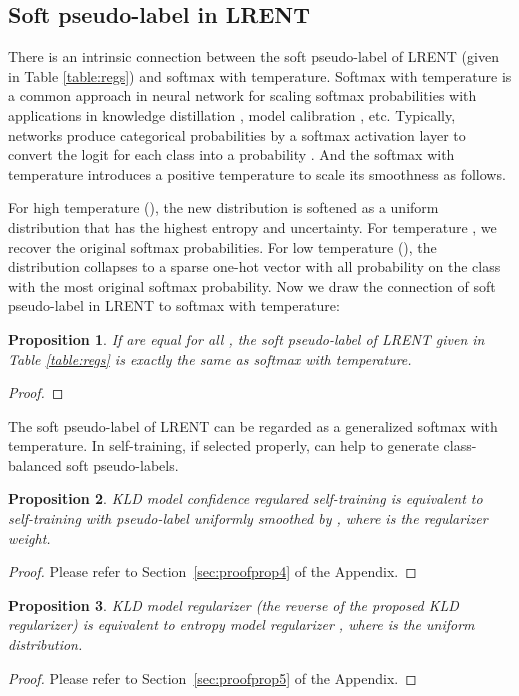 \documentclass[10pt,twocolumn,letterpaper]{article}
\theoremstyle{plain}
\newtheorem{proposition}{Proposition}
\begin{document}
\subsection{Soft pseudo-label in LRENT}
There is an intrinsic connection between the soft pseudo-label of LRENT (given in Table \ref{table:regs}) and softmax with temperature. Softmax with temperature \cite{hinton2015distilling} is a common approach in neural network for scaling softmax probabilities with applications in knowledge distillation \cite{hinton2015distilling}, model calibration \cite{pmlr-v70-guo17a}, etc. Typically, networks produce categorical probabilities by a softmax activation layer to convert
the logit  for each class into a probability . And the softmax with temperature introduces a positive temperature  to scale its smoothness as follows.


For high temperature (), the new distribution is softened as a uniform distribution that has the highest entropy and uncertainty. For temperature , we recover the original softmax probabilities. For low temperature (), the distribution collapses to a sparse one-hot vector with all probability on the class with the most original softmax probability. Now we draw the connection of soft pseudo-label in LRENT to softmax with temperature:
\begin{proposition}\label{prop:prop3}
	If  are equal for all , the soft pseudo-label of LRENT given in Table \ref{table:regs} is exactly the same as softmax with temperature.
\end{proposition}
\begin{proof}
	
\end{proof}
The soft pseudo-label of LRENT can be regarded as a generalized softmax with temperature. In self-training, if selected properly,  can help to generate class-balanced soft pseudo-labels.

\begin{proposition}\label{prop:prop4}
	\textit{KLD model confidence regulared self-training is equivalent to self-training with pseudo-label uniformly smoothed by , where  is the regularizer weight.}
\end{proposition}
\begin{proof}
	Please refer to Section~\ref{sec:proofprop4} of the Appendix.
\end{proof}

\begin{proposition}\label{prop:prop5}
 KLD model regularizer (the reverse of the proposed  KLD regularizer) is equivalent to entropy model regularizer , where  is the uniform distribution.
\end{proposition}
\begin{proof}
	Please refer to Section~\ref{sec:proofprop5} of the Appendix.
\end{proof}
\end{document}
